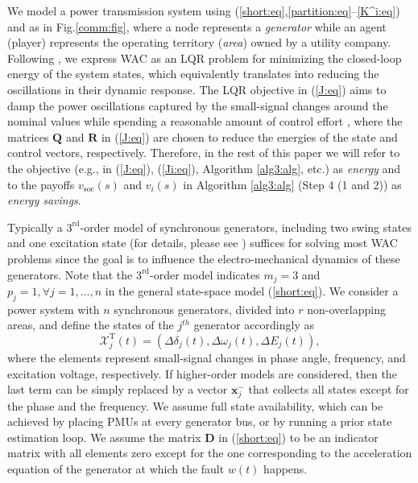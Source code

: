 \documentclass[12pt, draftclsnofoot,onecolumn]{IEEEtran}
\begin{document}
We model a power transmission system using (\ref{short:eq},\ref{partition:eq}--\ref{K^i:eq}) and as in Fig.\ref{comm:fig}, where a node represents a {\it generator} while an agent (player) represents the operating territory ({\it area}) owned by a utility company. Following \cite{dorjovchebulTPS14,lianensuring}, we express WAC as an LQR problem for minimizing the closed-loop energy of the system states, which equivalently translates into reducing the oscillations in their dynamic response. The LQR objective in (\ref{J:eq}) aims to damp the power oscillations captured by the small-signal changes around the nominal values while spending a reasonable amount of control effort \cite{dorjovchebulTPS14}, where the matrices $\boldsymbol Q$ and $\boldsymbol R$ in (\ref{J:eq}) are chosen to reduce the energies of the state and control vectors, respectively. Therefore, in the rest of this paper we will refer to the objective (e.g., in (\ref{J:eq}), (\ref{Ji:eq}), Algorithm \ref{alg3:alg}, etc.) as {\it energy} and to the payoffs $v_{\mathrm{soc}}(s)$ and $v_i(s)$ in Algorithm \ref{alg3:alg} (Step 4 (1 and 2)) as {\it energy savings}. 
 










Typically a $3^{\mathrm{rd}}$-order model of synchronous generators, including two swing states and one excitation state (for details, please see \cite{pramod}) suffices for solving most WAC problems since the goal is to influence the electro-mechanical dynamics of these generators. Note that the $3^{\mathrm{rd}}$-order model indicates $m_j = 3$ and $p_j = 1, \forall j = 1,...,n$ in the general state-space model ({\ref{short:eq}}). We consider a power system with $n$ synchronous generators, divided into $r$ non-overlapping areas, and define the states of the $j^{th}$ generator accordingly as
\begin{equation}
{\mathcal X}_j^{\mathrm{T}}(t) = \left(\Delta \delta_j(t), \Delta \omega_j(t), \Delta E_j(t)\right),
\end{equation}
\noindent where the elements represent small-signal changes in phase angle, frequency, and excitation voltage, respectively. If higher-order models are considered, then the last term can be simply replaced by a vector $\boldsymbol{x}_j^{-}$ that collects all states except for the phase and the frequency. We assume full state availability, which can be achieved by placing PMUs at every generator bus, or by running a prior state estimation loop. We assume the matrix $\boldsymbol{D}$ in (\ref{short:eq}) to be an indicator matrix with all elements zero except for the one corresponding to the acceleration equation of the generator at which the fault $w(t)$ happens.
\end{document}
